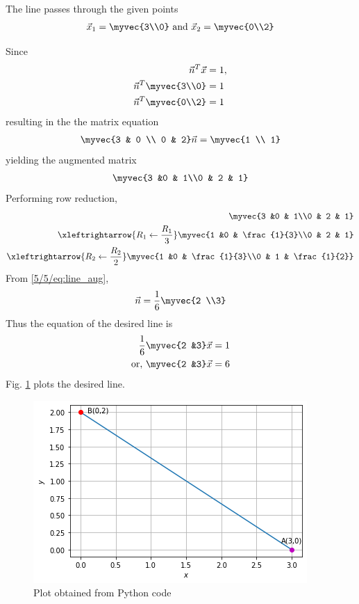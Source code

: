 The line passes through the given points
\begin{align}
\vec{x}_{1}=\myvec{3\\0} \text{ and } \vec{x}_{2}=\myvec{0\\2}
\end{align}

Since
\begin{align}
\vec{n}^{T}\vec{x}&=1,
\\
\vec{n}^{T}\myvec{3\\0}&=1\\
\vec{n}^{T}\myvec{0\\2}&=1
\end{align}
%
resulting in the the matrix equation
\begin{align}
\myvec{3 & 0 \\ 0 & 2} \vec{n} = \myvec{1 \\ 1}
\end{align}
%
yielding the augmented matrix
\begin{align}
\myvec{3 &0 & 1\\0 & 2 & 1} 
\end{align}
%
Performing row reduction,
\begin{align}
\myvec{3 &0 & 1\\0 & 2 & 1} 
\\
\xleftrightarrow {R_1\leftarrow \frac{R_1}{3}}\myvec{1 &0 & \frac{1}{3}\\0 & 2 & 1}\\ 
\xleftrightarrow {R_2\leftarrow \frac{R_2}{2}}\myvec{1 &0 & \frac{1}{3}\\0 & 1 & \frac{1}{2}}\\
\label{5/5/eq:line_aug}
\end{align}
%
From \eqref{5/5/eq:line_aug},
\begin{align}
\vec{n} = \frac{1}{6}\myvec{2 \\3}
\end{align}
%
Thus the equation of the desired line is 
\begin{align}
\frac{1}{6}\myvec{2 &3}\vec{x} &= 1
\\
\text{or, } \myvec{2 &3}\vec{x} &= 6
\end{align}
Fig. \ref{5/5/Fig:1} plots the desired line.
\begin{figure}[!ht]
\centering
\includegraphics[width=\columnwidth]{image.png}
\caption{Plot obtained from Python code}
\label{5/5/Fig:1}
\end{figure}
